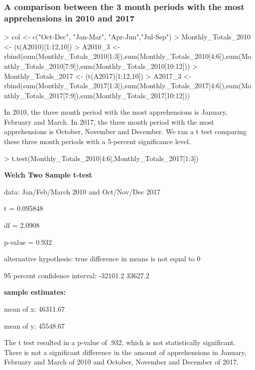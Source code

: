 \documentclass[letterpaper]{article}
\begin{document}
\subsubsection{A comparison between the 3 month periods with the most apprehensions in 2010 and 2017}

\begin{Schunk}
\begin{Sinput}
> col <- c("Oct-Dec", "Jan-Mar", "Apr-Jun","Jul-Sep")
> Monthly_Totals_2010 <- (t(A2010)[1:12,10])
> A2010_3 <- rbind(sum(Monthly_Totals_2010[1:3]),sum(Monthly_Totals_2010[4:6]),sum(Monthly_Totals_2010[7:9]),sum(Monthly_Totals_2010[10:12]))
> Monthly_Totals_2017 <- (t(A2017)[1:12,10])
> A2017_3 <- rbind(sum(Monthly_Totals_2017[1:3]),sum(Monthly_Totals_2017[4:6]),sum(Monthly_Totals_2017[7:9]),sum(Monthly_Totals_2017[10:12]))
\end{Sinput}
\end{Schunk}

In 2010, the three month period with the most apprehensions is January, February and March. In 2017, the three month period with the most apprehensions is October, November and December. We ran a t test comparing these three month periods with a 5-percent significance level.

\begin{Schunk}
\begin{Sinput}
> t.test(Monthly_Totals_2010[4:6],Monthly_Totals_2017[1:3])
\end{Sinput}
\end{Schunk}

\textbf{Welch Two Sample t-test}

data: Jan/Feb/March 2010 and Oct/Nov/Dec 2017\par
t = 0.095848\par
df = 2.0908\par
p-value = 0.932\par
alternative hypothesis: true difference in means is not equal to 0\par
95 percent confidence interval: -32101.2  33627.2\par
\par
\bigskip
\textbf{sample estimates:}\par
mean of x: 46311.67\par
mean of y: 45548.67\par
\bigskip
The t test resulted in a p-value of .932, which is not statistically significant. There is not a significant difference in the amount of apprehensions in January, February and March of 2010 and October, November and December of 2017.
\end{document}
